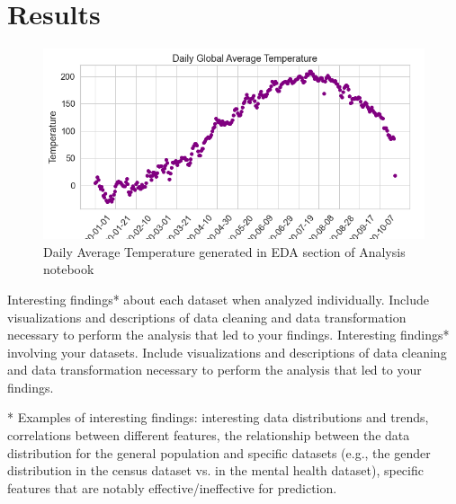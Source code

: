 \section{Results}
\begin{figure}
    \centering
    \includegraphics[width=\columnwidth]{figures/DailyAveTemp.png}
    \caption{Daily Average Temperature generated in EDA section of Analysis notebook}
    \label{fig:my_label}
\end{figure}
    

Interesting findings* about each dataset when analyzed individually. Include visualizations and descriptions of data cleaning and data transformation necessary to perform the analysis that led to your findings.
Interesting findings* involving your datasets. Include visualizations and descriptions of data cleaning and data transformation necessary to perform the analysis that led to your findings.

* Examples of interesting findings: interesting data distributions and trends, correlations between different features, the relationship between the data distribution for the general population and specific datasets (e.g., the gender distribution in the census dataset vs. in the mental health dataset), specific features that are notably effective/ineffective for prediction.

